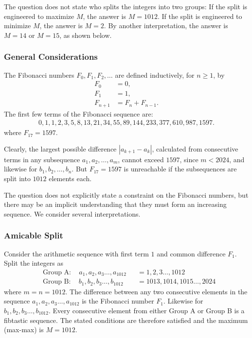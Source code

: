 
The question does not state who splits the integers into two groups: If the split is engineered to maximize $M$, the answer is $M=1012$. If the split is engineered to minimize $M$, the answer is $M=2$. By another interpretation, the answer is $M=14$ or $M=15$, as shown below.

\subsubsection*{General Considerations}

The Fibonacci numbers $F_{0},F_{1},F_{2},\ldots$ are defined inductively, for $n \ge 1$, by 
\begin{align*}
F_{0} & = 0, \\
F_{1} & = 1, \\ 
F_{n+1} & = F_{n} + F_{n-1}.
\end{align*}
The first few terms of the Fibonacci sequence are:
\begin{align*}
0, 1, 1, 2, 3, 5, 8, 13, 21, 34, 55, 89, 144, 233, 377, 610, 987, 1597.
\end{align*}
where $F_{17}=1597$.

Clearly, the largest possible difference $|a_{k+1}-a_{k}|$, calculated from consecutive terms in any subsequence $a_{1},a_{2},\ldots,a_{m}$, cannot exceed $1597$, since $m<2024$, and likewise for $b_{1},b_{2},\ldots,b_{n}$. But $F_{17}=1597$ is unreachable if the subsequences are split into $1012$ elements each. 

The question does not explicitly state a constraint on the Fibonacci numbers, but there may be an implicit understanding that they must form an increasing sequence. We consider several interpretations. 

\subsubsection*{Amicable Split}

Consider the arithmetic sequence with first term $1$ and common difference $F_{1}$. Split the integers as
\begin{align*}
& \text{Group A}: 
\quad
a_{1},a_{2},a_{3}\ldots,a_{1012}
&& = 1,2,3\ldots,1012
\\
& \text{Group B}: 
\quad
b_{1},b_{2},b_{3}\ldots,b_{1012}
&& = 1013,1014,1015\ldots,2024
\end{align*}
where $m=n=1012$.
The difference between any two consecutive elements in the sequence $a_{1},a_{2},a_{3}\ldots,a_{1012}$ is the Fibonacci number $F_{1}$. Likewise for $b_{1},b_{2},b_{3}\ldots,b_{1012}$. Every consecutive element from either Group A or Group B is a fibtastic sequence. The stated conditions are therefore satisfied and the maximum (max-max) is $M=1012$.

